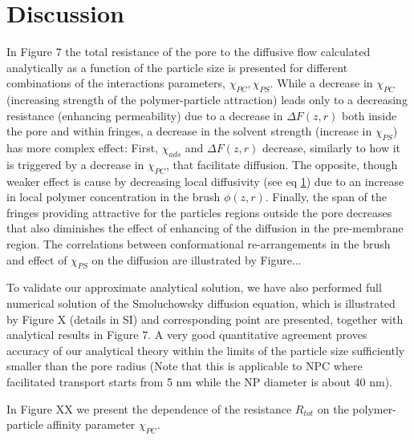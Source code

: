 \documentclass[12pt, a4paper]{article}
\begin{document}
\section{Discussion}
In Figure 7 the total resistance of the pore to the diffusive flow calculated analytically as a function of the particle size is presented for 
different combinations of the interactions parameters, $\chi_{PC}, \chi_{PS}$.
While a decrease in $\chi_{PC}$ (increasing strength of the polymer-particle attraction) leads only to a decreasing resistance (enhancing permeability) 
due to a decrease in $\Delta F(z,r)$ both inside the pore and within fringes, a decrease in the solvent strength (increase in $\chi_{PS}$) has more complex effect: First,
$\chi_{ads}$ and $\Delta F(z,r)$ decrease, similarly to how it is triggered by a decrease in $\chi_{PC}$, that facilitate diffusion. The opposite, though weaker effect is cause by
decreasing local diffusivity (see eq \ref{}) due to an increase in local polymer concentration in the brush $\phi(z,r)$. Finally, the span of the fringes providing attractive for the particles
regions outside the pore decreases that also diminishes the effect of enhancing of the diffusion in the pre-membrane region.
The correlations between conformational re-arrangements in the brush and effect of $\chi_{PS}$ on the diffusion are illustrated by Figure...

To validate our approximate analytical solution, we have also performed full numerical solution of the Smoluchowsky diffusion equation, which is illustrated by Figure X 
(details in SI) and corresponding point are presented, together with analytical results in Figure 7. A very good quantitative agreement proves accuracy of our analytical theory
within the limits of the particle size sufficiently smaller than the pore radius (Note that this is applicable to NPC where facilitated transport starts from 5 nm while the
NP diameter is about 40 nm).

In Figure XX we present the dependence of the resistance $R_{tot}$ on the polymer-particle affinity parameter $\chi_{PC}$.
\end{document}
